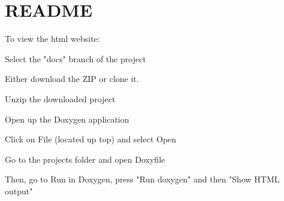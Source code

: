 \chapter{README }
\hypertarget{md__r_e_a_d_m_e}{}\label{md__r_e_a_d_m_e}
To view the html website:
\begin{DoxyEnumerate}
\item Select the "{}docs"{} branch of the project
\item Either download the ZIP or clone it.
\item Unzip the downloaded project
\item Open up the Doxygen application
\item Click on File (located up top) and select Open
\item Go to the project\textquotesingle{}s folder and open Doxyfile
\item Then, go to Run in Doxygen, press "{}\+Run doxygen"{} and then "{}\+Show HTML output"{} 
\end{DoxyEnumerate}